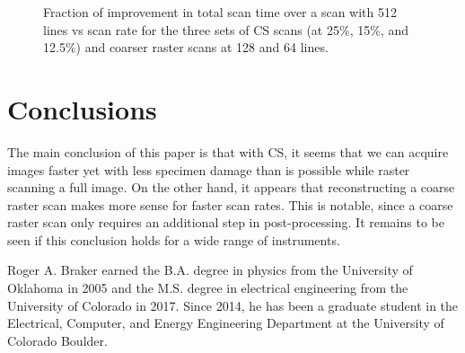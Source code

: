 \documentclass[journal]{IEEEtran}
\begin{document}
\begin{figure}
  
  \caption{Fraction of improvement in total scan time over a scan with
    512 lines vs scan rate for the three sets of CS scans (at 25\%,
    15\%, and 12.5\%) and coarser raster scans at 128 and 64 lines.}
  \label{fig:improve_512}
\end{figure}

\section{Conclusions}\label{sec:conclusions}
The main conclusion of this paper is that with CS, it seems that we
can acquire images faster yet with less specimen damage than is
possible while raster scanning a full image. On the other hand, it
appears that reconstructing a coarse raster scan makes more sense for
faster scan rates. This is notable, since a coarse raster scan only
requires an additional step in post-processing. It remains to be seen
if this conclusion holds for a wide range of instruments.


\begin{IEEEbiography}
  {Roger A. Braker} earned the B.A. degree in physics from the University of Oklahoma in 2005 and the M.S. degree in electrical engineering from the University of Colorado in 2017.
  Since 2014, he has been a graduate student in the Electrical, Computer, and Energy Engineering
  Department at the University of Colorado Boulder.

\end{IEEEbiography}
\end{document}
